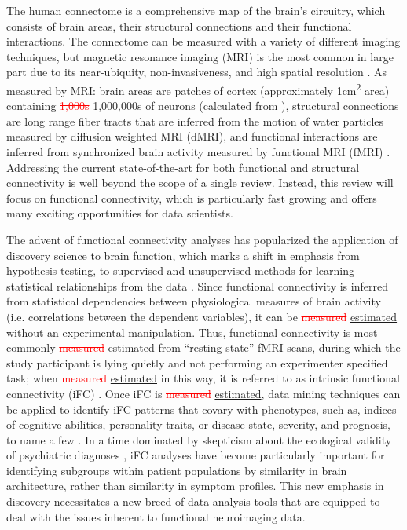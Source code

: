 \documentclass{bmcart}
\newcommand{\ADDED}[1]{\textcolor{markercolor}{\uline{#1}}}
\newcommand{\DELETED}[1]{\textcolor{red}{\sout{#1}}}
\def\marker{%
    \vadjust{{%
	\llap{\smash{%
	    \color{purple}%
	    \scalebox{1.8}{$\filledmedtriangleright$}}\;}%
    }}\hspace*{-.1ex}%
}%
\begin{document}
The human connectome is a comprehensive map of the brain's circuitry, which consists of brain areas, their structural connections and their functional interactions. The connectome can be measured with a variety of different imaging techniques, but magnetic resonance imaging (MRI) is the most common in large part due to its near-ubiquity, non-invasiveness, and high spatial resolution \cite{Craddock2013}. As measured by MRI: brain areas are patches of \marker{cortex} (approximately 1\si{\centi\meter\squared} area) \cite{Varela2001} containing \DELETED{1,000s} \ADDED{1,000,000s} of neurons (calculated from \cite{Aguirre2014}), structural connections are long range fiber tracts that are inferred from the motion of water particles measured by diffusion weighted MRI (dMRI), and functional interactions are inferred from synchronized brain activity measured by functional MRI (fMRI) \cite{Behrens2012}. Addressing the current state-of-the-art for both functional and structural connectivity is well beyond the scope of a single review. Instead, this review will focus on functional connectivity, which is particularly fast growing and offers many exciting opportunities for data scientists.

The advent of functional connectivity analyses has popularized the application of discovery science to brain function, which marks a shift in emphasis from hypothesis testing, to supervised and unsupervised methods for learning statistical relationships from the data \cite{Biswal2010}. Since functional connectivity is inferred from statistical dependencies between physiological measures of brain activity (i.e. correlations between the dependent variables), it can be \DELETED{measured} \ADDED{estimated} without an experimental manipulation. Thus, functional connectivity is most commonly \DELETED{measured} \ADDED{estimated} from ``resting state'' fMRI scans, during which the study participant is lying quietly and not performing an experimenter specified task; when \DELETED{measured} \ADDED{estimated} in this way, it is referred to as intrinsic functional connectivity (iFC) \cite{Biswal1995}. Once iFC is \DELETED{measured} \ADDED{estimated}, data mining techniques can be applied to identify iFC patterns that covary with phenotypes, such as, indices of cognitive abilities, personality traits, or disease state, severity, and prognosis, to name a few \cite{Varoquaux2013}. In a time dominated by skepticism about the ecological validity of psychiatric diagnoses \cite{Kapur2012}, iFC analyses have become particularly important for identifying subgroups within patient populations by similarity in brain architecture, rather than similarity in symptom profiles. This new emphasis in discovery necessitates a new breed of data analysis tools that are equipped to deal with the issues inherent to functional neuroimaging data.
\end{document}
